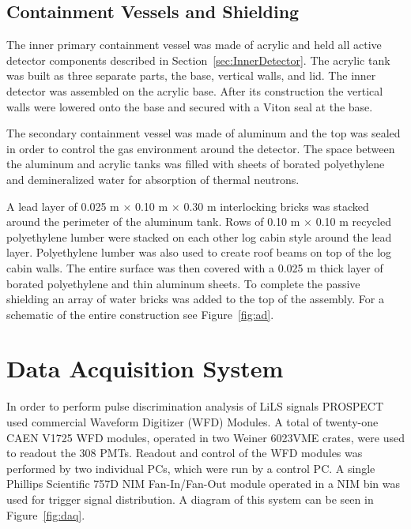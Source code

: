 \subsection{Containment Vessels and Shielding} \label{sec:shielding}

The inner primary containment vessel was made of acrylic and held all active detector components described in Section~\ref{sec:InnerDetector}. 
The acrylic tank was built as three separate parts, the base, vertical walls, and lid. 
The inner detector was assembled on the acrylic base. After its construction the vertical walls were lowered onto the base and secured with a Viton seal at the base. 

The secondary containment vessel was made of aluminum and the top was sealed in order to control the gas environment around the detector.
The space between the aluminum and acrylic tanks was filled with sheets of borated polyethylene and demineralized water for absorption of thermal neutrons.

A lead layer of 0.025 m $\times$ 0.10 m $\times$ 0.30 m interlocking bricks was stacked around the perimeter of the aluminum tank. 
Rows of 0.10 m $\times$ 0.10 m recycled polyethylene lumber were stacked on each other log cabin style around the lead layer.
Polyethylene lumber was also used to create roof beams on top of the log cabin walls.
The entire surface was then covered with a 0.025 m thick layer of borated polyethylene and thin aluminum sheets. 
To complete the passive shielding an array of water bricks was added to the top of the assembly. 
For a schematic of the entire construction see Figure~\ref{fig:ad}.



\section{Data Acquisition System} \label{sec:DAQ}

In order to perform pulse discrimination analysis of LiLS signals PROSPECT used commercial Waveform Digitizer (WFD) Modules.
A total of twenty-one CAEN V1725 WFD modules, operated in two Weiner 6023VME crates, were used to readout the 308 PMTs. 
Readout and control of the WFD modules was performed by two individual PCs, which were run by a control PC. 
A single Phillips Scientific 757D NIM Fan-In/Fan-Out module operated in a NIM bin was used for trigger signal distribution.
A diagram of this system can be seen in Figure~\ref{fig:daq}.


